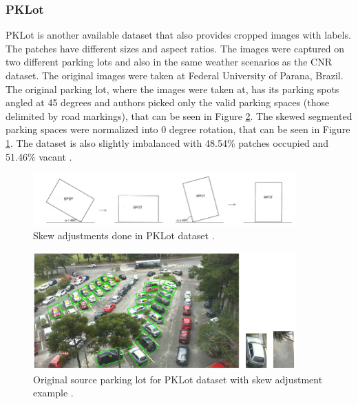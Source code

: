 \documentclass[thesis=M,english]{FITthesis}[2019/03/06]
\begin{document}
\subsubsection{PKLot}
PKLot is another available dataset that also provides cropped images with labels. The patches have different sizes and aspect ratios. The images were captured on two different parking lots and also in the same weather scenarios as the CNR dataset. The original images were taken at Federal University of Parana, Brazil.\\

The original parking lot, where the images were taken at, has its parking spots angled at 45 degrees and authors picked only the valid parking spaces (those delimited by road markings), that can be seen in Figure \ref{label:pk_lot_orig}. The skewed segmented parking spaces were normalized into 0 degree rotation, that can be seen in Figure \ref{label:pk_lot_skew}. The dataset is also slightly imbalanced with 48.54\% patches occupied and 51.46\% vacant \cite{pklot_dataset}.

\begin{figure}[ht]
	\centering
	\includegraphics[width=0.9\textwidth]{imgs/pklot-skew.png}
	\caption{Skew adjustments done in PKLot dataset \cite{pklot_dataset}.}
	\label{label:pk_lot_skew}
\end{figure}

\begin{figure}[ht]
	\centering
	\includegraphics[width=0.9\textwidth]{imgs/pklot-example.png}
	\caption{Original source parking lot for PKLot dataset with skew adjustment example \cite{pklot_dataset}.}
	\label{label:pk_lot_orig}
\end{figure}
\end{document}
